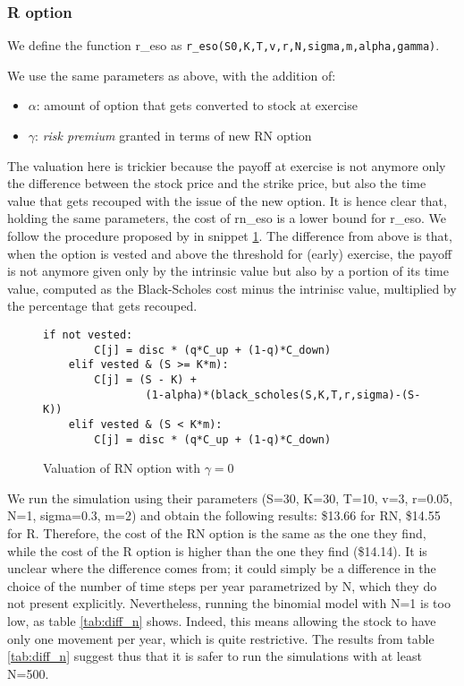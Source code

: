 \subsubsection{R option}
We define the function r\_eso as \verb|r_eso(S0,K,T,v,r,N,sigma,m,alpha,gamma)|.
    


We use the same parameters as above, with the addition of:
\begin{itemize}
    \item $\alpha$: amount of option that gets converted to stock at exercise
    \item $\gamma$: \textit{risk premium} granted in terms of new RN option 
\end{itemize}

The valuation here is trickier because the payoff at exercise is not anymore only the difference between the stock price and the strike price, but also the time value that gets recouped with the issue of the new option. It is hence clear that, holding the same parameters, the cost of rn\_eso is a lower bound for r\_eso. We follow the procedure proposed by \cite{huang2013dynamic} in snippet \ref*{fig:val_r_gamma0}. The difference from above is that, when the option is vested and above the threshold for (early) exercise, the payoff is not anymore given only by the intrinsic value but also by a portion of its time value, computed as the Black-Scholes cost minus the intrinisc value, multiplied by the percentage that gets recouped. 

\begin{figure}[H]
    \begin{lstlisting}[breaklines, basicstyle=\ttfamily\small]
    if not vested:                
        C[j] = disc * (q*C_up + (1-q)*C_down)
    elif vested & (S >= K*m): 
        C[j] = (S - K) + 
                (1-alpha)*(black_scholes(S,K,T,r,sigma)-(S-K))
    elif vested & (S < K*m):
        C[j] = disc * (q*C_up + (1-q)*C_down)
    \end{lstlisting}
    \caption{Valuation of RN option with $\gamma=0$}
    \label{fig:val_r_gamma0}
\end{figure}

 We run the simulation using their parameters (S=30, K=30, T=10, v=3, r=0.05, N=1, sigma=0.3, m=2) and obtain the following results: \$13.66 for RN, \$14.55 for R. Therefore, the cost of the RN option is the same as the one they find, while the cost of the R option is higher than the one they find (\$14.14). It is unclear where the difference comes from; it could simply be a difference in the choice of the number of time steps per year parametrized by N, which they do not present explicitly. Nevertheless, running the binomial model with N=1 is too low, as table \ref*{tab:diff_n} shows. Indeed, this means allowing the stock to have only one movement per year, which is quite restrictive. The results from table \ref*{tab:diff_n} suggest thus that it is safer to run the simulations with at least N=500.

